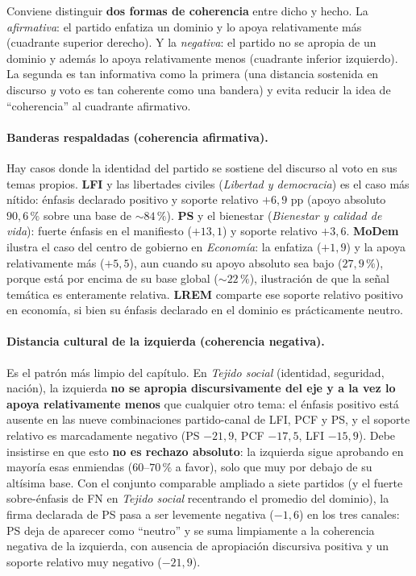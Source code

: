 Conviene distinguir \textbf{dos formas de coherencia} entre dicho y hecho. La
\emph{afirmativa}: el partido enfatiza un dominio y lo apoya relativamente más
(cuadrante superior derecho). Y la \emph{negativa}: el partido no se apropia de un
dominio y además lo apoya relativamente menos (cuadrante inferior izquierdo). La
segunda es tan informativa como la primera (una distancia sostenida en discurso
\emph{y} voto es tan coherente como una bandera) y evita reducir la idea de
``coherencia'' al cuadrante afirmativo.

\paragraph{Banderas respaldadas (coherencia afirmativa).}
Hay casos donde la identidad del partido se sostiene del discurso al voto en sus
temas propios. \textbf{LFI} y las libertades civiles (\emph{Libertad y
democracia}) es el caso más nítido: énfasis declarado positivo y soporte relativo
$+6{,}9$ pp (apoyo absoluto $90{,}6\,\%$ sobre una base de $\sim 84\,\%$). \textbf{PS}
y el bienestar (\emph{Bienestar y calidad de vida}): fuerte énfasis en el manifiesto ($+13{,}1$)
y soporte relativo $+3{,}6$. \textbf{MoDem} ilustra el caso del centro de
gobierno en \emph{Economía}: la enfatiza ($+1{,}9$) y la apoya relativamente más
($+5{,}5$), aun cuando su apoyo absoluto sea bajo ($27{,}9\,\%$), porque está por
encima de su base global ($\sim 22\,\%$), ilustración de que la señal temática
es enteramente relativa. \textbf{LREM} comparte ese soporte relativo positivo
en economía, si bien su énfasis declarado en el dominio es prácticamente neutro.

\paragraph{Distancia cultural de la izquierda (coherencia negativa).}
Es el patrón más limpio del capítulo. En \emph{Tejido social} (identidad,
seguridad, nación), la izquierda \textbf{no se apropia discursivamente del eje y a
la vez lo apoya relativamente menos} que cualquier otro tema: el énfasis positivo
está ausente en las nueve combinaciones partido-canal de LFI, PCF y PS, y el
soporte relativo es marcadamente negativo (PS $-21{,}9$, PCF $-17{,}5$, LFI
$-15{,}9$). Debe insistirse en que esto \textbf{no es rechazo absoluto}: la
izquierda sigue aprobando en mayoría esas enmiendas ($60$--$70\,\%$ a favor), solo
que muy por debajo de su altísima base. Con el conjunto comparable ampliado a
siete partidos (y el fuerte sobre-énfasis de FN en \emph{Tejido social}
recentrando el promedio del dominio), la firma declarada de PS pasa a ser
levemente negativa ($-1{,}6$) en los tres canales: PS deja de aparecer como
``neutro'' y se suma limpiamente a la coherencia negativa de la izquierda, con
ausencia de apropiación discursiva positiva y un soporte relativo muy negativo
($-21{,}9$).

